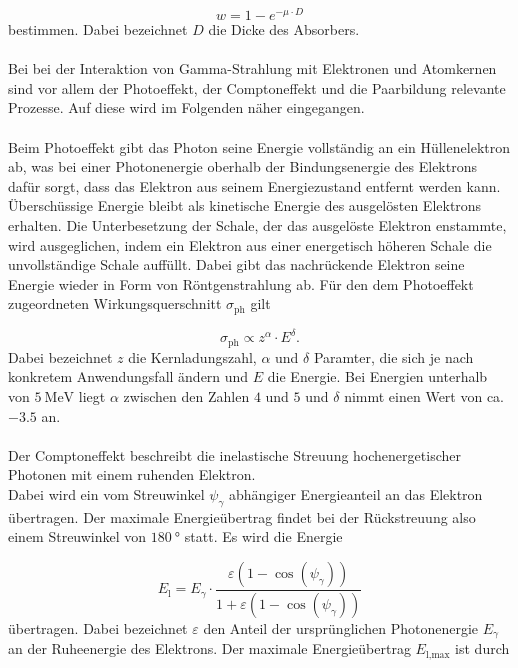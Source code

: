 \begin{equation}
  \label{eqn:wkeit}
  w = 1 - e^{-\mu \cdot D}
\end{equation}
bestimmen. Dabei bezeichnet $D$ die Dicke des Absorbers.\\ \\
Bei bei der Interaktion von Gamma-Strahlung mit Elektronen und Atomkernen sind vor allem
der Photoeffekt, der Comptoneffekt und die Paarbildung relevante
Prozesse. Auf diese wird im Folgenden näher eingegangen.\\ \\
Beim Photoeffekt gibt das Photon seine Energie vollständig an ein Hüllenelektron ab, was bei
einer Photonenergie oberhalb der Bindungsenergie des Elektrons dafür sorgt, dass das Elektron
aus seinem Energiezustand entfernt werden kann. Überschüssige Energie bleibt als kinetische
Energie des ausgelösten Elektrons erhalten. Die Unterbesetzung der Schale, der das ausgelöste
Elektron enstammte, wird ausgeglichen, indem ein Elektron aus einer energetisch höheren Schale
die unvollständige Schale auffüllt. Dabei gibt das nachrückende Elektron seine Energie wieder
in Form von Röntgenstrahlung ab. Für den dem Photoeffekt zugeordneten Wirkungsquerschnitt $\sigma_\text{ph}$ gilt

\begin{equation}
  \label{eqn:phquerschnitt}
  \sigma_\text{ph} \propto z^{\alpha} \cdot E^{\delta}.
\end{equation}
Dabei bezeichnet $z$ die Kernladungszahl, $\alpha$ und $\delta$ Paramter, die sich je nach konkretem Anwendungsfall
ändern und $E$ die Energie. Bei Energien unterhalb von $\SI{5}{\mega\electronvolt}$ liegt $\alpha$ zwischen den Zahlen
$4$ und $5$ und $\delta$ nimmt einen Wert von ca. $-3.5$ an.\\ \\
Der Comptoneffekt beschreibt die inelastische Streuung hochenergetischer Photonen mit einem
ruhenden Elektron.\\
Dabei wird ein vom Streuwinkel $\psi_{\gamma}$ abhängiger Energieanteil an das Elektron übertragen.
Der maximale Energieübertrag findet bei der Rückstreuung also einem Streuwinkel
von $\SI{180}{\degree}$ statt. Es wird die Energie

\begin{equation}
  \label{eqn:comptonuebertrag}
  E_\text{l} = E_{\gamma} \cdot \frac{\varepsilon \left( 1 - \cos\left( \psi_{\gamma} \right) \right)}{1
  + \varepsilon \left( 1 - \cos\left( \psi_{\gamma} \right) \right)}
\end{equation}
übertragen. Dabei bezeichnet $\varepsilon$ den Anteil der ursprünglichen
Photonenergie $E_{\gamma}$ an der Ruheenergie des Elektrons. Der maximale Energieübertrag $E_\text{l,max}$ ist durch

